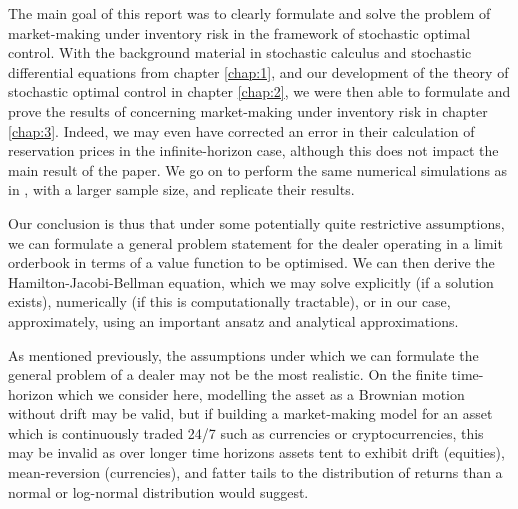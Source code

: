 

The main goal of this report was to clearly formulate and solve the problem of 
market-making under inventory risk in the framework of stochastic optimal control.
With the background material in stochastic calculus and stochastic differential 
equations from chapter \ref{chap:1}, and our development of the theory of 
stochastic optimal control in chapter \ref{chap:2}, we were then able to formulate 
and prove the results of \cite{AS2008} concerning market-making under inventory 
risk in chapter \ref{chap:3}. Indeed, we may even have corrected an error in their calculation
of reservation prices in the infinite-horizon case, although this does not impact the 
main result of the paper. We go on to perform the same numerical simulations as 
in \cite{AS2008}, with a larger sample size, and replicate their results.

Our conclusion is thus that under some potentially quite restrictive assumptions,
we can formulate a general problem statement for the dealer operating in a limit 
orderbook in terms of a value function to be optimised. We can then derive the 
Hamilton-Jacobi-Bellman equation, which we may solve explicitly (if a solution exists),
numerically (if this is computationally tractable), or in our case, approximately, using 
an important ansatz and analytical approximations.


As mentioned previously, the assumptions under which we can formulate the general 
problem of a dealer may not be the most realistic. On the finite time-horizon which
we consider here, modelling the asset as a Brownian motion without drift may be valid,
but if building a market-making model for an asset which is continuously traded 24/7
such as currencies or cryptocurrencies, this may be invalid as over longer time horizons
assets tent to exhibit drift (equities), mean-reversion (currencies), and fatter tails 
to the distribution of returns than a normal or log-normal distribution would suggest.

